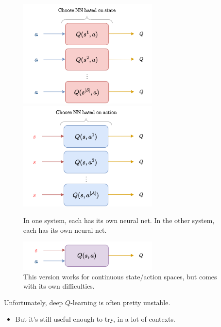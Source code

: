         \begin{figure}[H]
            \includegraphics[width=70mm,scale=0.5]{images/rl_images/state_nns.png}
            \quad
            \includegraphics[width=70mm,scale=0.5]{images/rl_images/action_nns.png}
            \caption*{In one system, each  has its own neural net. In the other system, each  has its own neural net.}
        \end{figure}

        \begin{figure}[H]
            \centering
            \includegraphics[width=70mm,scale=0.5]{images/rl_images/single_nn.png}
            \caption*{This version works for continuous state/action spaces, but comes with its own difficulties.}
        \end{figure}

        Unfortunately, deep $Q$-learning is often pretty unstable.

        \begin{itemize}
            \item But it's still useful enough to try, in a lot of contexts.
        \end{itemize}




